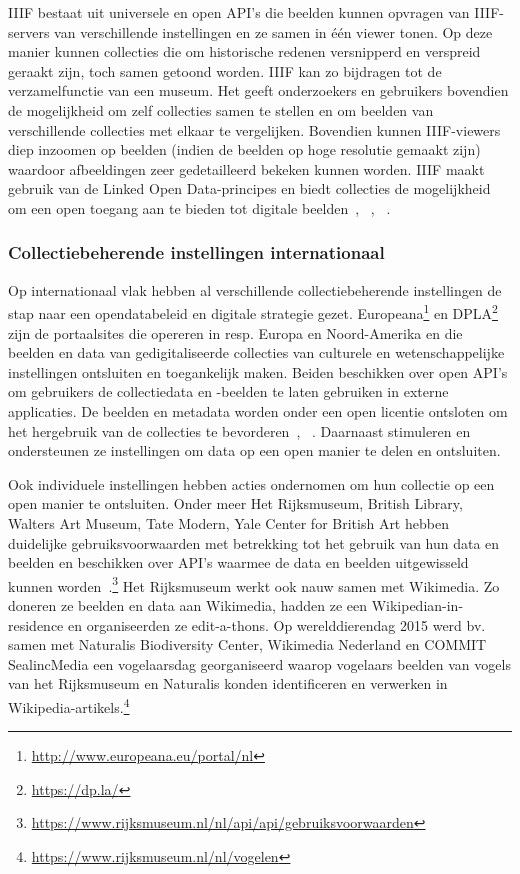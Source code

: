 \documentclass[fleqn,10pt]{voorstel}
\begin{document}
IIIF bestaat uit universele en open API's die beelden kunnen opvragen van IIIF-servers van verschillende instellingen en ze samen in één viewer tonen. Op deze manier kunnen collecties die om historische redenen versnipperd en verspreid geraakt zijn, toch samen getoond worden. IIIF kan zo bijdragen tot de verzamelfunctie van een museum. Het geeft onderzoekers en gebruikers bovendien de mogelijkheid om zelf collecties samen te stellen en om beelden van verschillende collecties met elkaar te vergelijken. Bovendien kunnen IIIF-viewers diep inzoomen op beelden (indien de beelden op hoge resolutie gemaakt zijn) waardoor afbeeldingen zeer gedetailleerd bekeken kunnen worden. IIIF maakt gebruik van de Linked Open Data-principes en biedt collecties de mogelijkheid om een open toegang aan te bieden tot digitale beelden~\autocite{YCBA2015}, ~\autocite{Pridal2015}, ~\autocite{Robson2015}.




\subsubsection{Collectiebeherende instellingen internationaal}
Op internationaal vlak hebben al verschillende collectiebeherende instellingen de stap naar een opendatabeleid en digitale strategie gezet. 
Europeana\footnote{\href{http://www.europeana.eu/portal/nl}{http://www.europeana.eu/portal/nl}} en DPLA\footnote{\href{https://dp.la/}{https://dp.la/}} zijn de portaalsites die opereren in resp. Europa en Noord-Amerika en die beelden en data van gedigitaliseerde collecties van culturele en wetenschappelijke instellingen ontsluiten en toegankelijk maken. Beiden beschikken over open API's om gebruikers de collectiedata en -beelden te laten gebruiken in externe applicaties. De beelden en metadata worden onder een open licentie ontsloten om het hergebruik van de collecties te bevorderen~\autocite{Europeana}, ~\autocite{DPLA}. Daarnaast stimuleren en ondersteunen ze instellingen om data op een open manier te delen en ontsluiten.

Ook individuele instellingen hebben acties ondernomen om hun collectie op een open manier te ontsluiten. Onder meer Het Rijksmuseum, British Library, Walters Art Museum, Tate Modern, Yale Center for British Art hebben duidelijke gebruiksvoorwaarden met betrekking tot het gebruik van hun data en beelden en beschikken over API's waarmee de data en beelden uitgewisseld kunnen worden~\autocite{openGLAM2016}.\footnote{\href{https://www.rijksmuseum.nl/nl/api/api/gebruiksvoorwaarden}{https://www.rijksmuseum.nl/nl/api/api/gebruiksvoorwaarden}} Het Rijksmuseum werkt ook nauw samen met Wikimedia. Zo doneren ze beelden en data aan Wikimedia, hadden ze een Wikipedian-in-residence en organiseerden ze edit-a-thons. Op werelddierendag 2015 werd bv. samen met Naturalis Biodiversity Center, Wikimedia Nederland en COMMIT SealincMedia een vogelaarsdag georganiseerd waarop vogelaars beelden van vogels van het Rijksmuseum en Naturalis konden identificeren en verwerken in Wikipedia-artikels.\footnote{\href{https://www.rijksmuseum.nl/nl/vogelen/}{https://www.rijksmuseum.nl/nl/vogelen}} 
\end{document}
